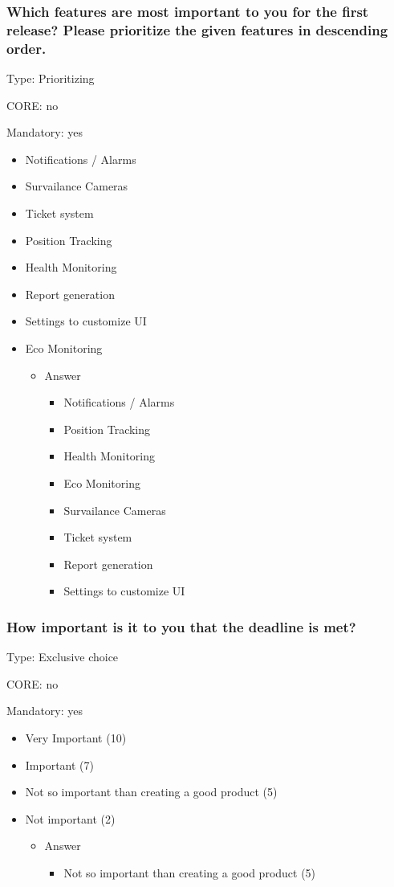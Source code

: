\subsubsection{Which features are most important to you for the first release? Please prioritize the given features in descending order.}
\label{sec:org7a4b4f5}

Type: Prioritizing 

CORE: no

Mandatory: yes 

\begin{itemize}
	\item Notifications / Alarms
	\item Survailance Cameras
	\item Ticket system
	\item Position Tracking
	\item Health Monitoring
	\item Report generation
	\item Settings to customize UI
	\item Eco Monitoring
	
	\begin{itemize}
		\item Answer
		\begin{itemize}
			\item Notifications / Alarms
			\item Position Tracking
			\item Health Monitoring
			\item Eco Monitoring
			\item Survailance Cameras
			\item Ticket system
			\item Report generation
			\item Settings to customize UI
		\end{itemize}
	\end{itemize}
\end{itemize}

\subsubsection{How important is it to you that the deadline is met?}
\label{sec:orgfcc43e2}
Type: Exclusive choice 

CORE: no

Mandatory: yes 

\begin{itemize}
	\item Very Important (10)
	\item Important (7)
	\item Not so important than creating a good product (5)
	\item Not important (2)
	
	\begin{itemize}
		\item Answer
		\begin{itemize}
			\item Not so important than creating a good product (5)
		\end{itemize}
	\end{itemize}
\end{itemize}

